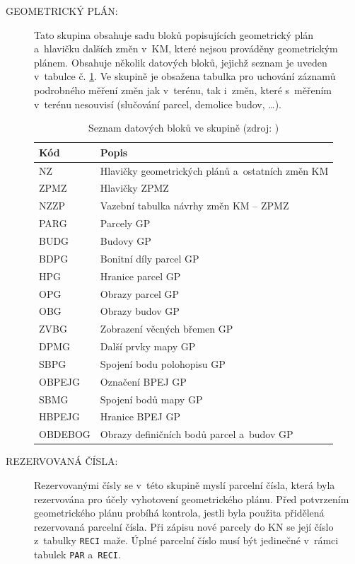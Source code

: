 \documentclass[a4paper,12pt,oneside]{book}
\begin{document}
\begin{description}
\item[GEOMETRICKÝ PLÁN:] Tato skupina obsahuje sadu bloků popisujících
  geometrický plán a~hlavičku dalších změn v~KM, které nejsou
  prováděny geometrickým plánem. Obsahuje několik datových bloků,
  jejichž seznam je uveden v~tabulce č. \ref{t_skupina_gp}. Ve skupině
  je obsažena tabulka pro uchování záznamů podrobného měření změn jak
  v~terénu, tak i~změn, které s~měřením v~terénu nesouvisí (slučování
  parcel, demolice budov, \dots). \cite{dp_landa} \cite{vfk_struktura}

\begin{table}[htbp]
\centering
\caption[Seznam datových bloků ve skupině ]{Seznam datových bloků ve skupině  (zdroj: \cite{vfk_struktura})}
\begin{tabular}{ll}
\toprule
\textbf{Kód} & \textbf{Popis} \\ 
\midrule
NZ & Hlavičky geometrických plánů a~ostatních změn KM \\ 
ZPMZ & Hlavičky ZPMZ \\ 
NZZP & Vazební tabulka návrhy změn KM -- ZPMZ \\ 
PARG & Parcely GP \\ 
BUDG & Budovy GP \\ 
BDPG & Bonitní díly parcel GP \\ 
HPG & Hranice parcel GP \\ 
OPG & Obrazy parcel GP \\ 
OBG & Obrazy budov GP \\ 
ZVBG & Zobrazení věcných břemen GP \\ 
DPMG & Další prvky mapy GP \\ 
SBPG & Spojení bodu polohopisu GP \\ 
OBPEJG & Označení BPEJ GP \\ 
SBMG & Spojení bodů mapy GP \\ 
HBPEJG & Hranice BPEJ GP \\ 
OBDEBOG & Obrazy definičních bodů parcel a~budov GP \\ 
\bottomrule
\end{tabular}
\label{t_skupina_gp}
\end{table}

\item[REZERVOVANÁ ČÍSLA:] Rezervovanými čísly se v~této skupině myslí
  parcelní čísla, která byla rezervována pro účely vyhotovení
  geometrického plánu. Před potvrzením geometrického plánu probíhá
  kontrola, jestli byla použita přidělená rezervovaná parcelní
  čísla. Při zápisu nové parcely do KN se její číslo z~tabulky
  \texttt{RECI} maže. Úplné parcelní číslo musí být jedinečné v~rámci
  tabulek \texttt{PAR} a~\texttt{RECI}.
 

\end{description}
\end{document}
